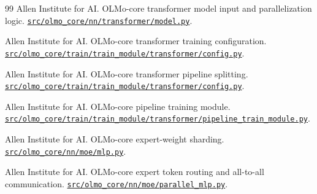 \documentclass[11pt]{article}
\begin{document}
\begin{thebibliography}{99}
Allen Institute for AI.
\newblock OLMo-core transformer model input and parallelization logic.
\newblock \href{https://github.com/allenai/OLMo-core/blob/92870a33c3fee060d57c3faec52b0b369ece85a6/src/olmo_core/nn/transformer/model.py}{\nolinkurl{src/olmo_core/nn/transformer/model.py}}.

Allen Institute for AI.
\newblock OLMo-core transformer training configuration.
\newblock \href{https://github.com/allenai/OLMo-core/blob/92870a33c3fee060d57c3faec52b0b369ece85a6/src/olmo_core/train/train_module/transformer/config.py}{\nolinkurl{src/olmo_core/train/train_module/transformer/config.py}}.

Allen Institute for AI.
\newblock OLMo-core transformer pipeline splitting.
\newblock \href{https://github.com/allenai/OLMo-core/blob/92870a33c3fee060d57c3faec52b0b369ece85a6/src/olmo_core/train/train_module/transformer/config.py}{\nolinkurl{src/olmo_core/train/train_module/transformer/config.py}}.

Allen Institute for AI.
\newblock OLMo-core pipeline training module.
\newblock \href{https://github.com/allenai/OLMo-core/blob/92870a33c3fee060d57c3faec52b0b369ece85a6/src/olmo_core/train/train_module/transformer/pipeline_train_module.py}{\nolinkurl{src/olmo_core/train/train_module/transformer/pipeline_train_module.py}}.

Allen Institute for AI.
\newblock OLMo-core expert-weight sharding.
\newblock \href{https://github.com/allenai/OLMo-core/blob/92870a33c3fee060d57c3faec52b0b369ece85a6/src/olmo_core/nn/moe/mlp.py}{\nolinkurl{src/olmo_core/nn/moe/mlp.py}}.

Allen Institute for AI.
\newblock OLMo-core expert token routing and all-to-all communication.
\newblock \href{https://github.com/allenai/OLMo-core/blob/92870a33c3fee060d57c3faec52b0b369ece85a6/src/olmo_core/nn/moe/parallel_mlp.py}{\nolinkurl{src/olmo_core/nn/moe/parallel_mlp.py}}.

\end{thebibliography}
\end{document}
